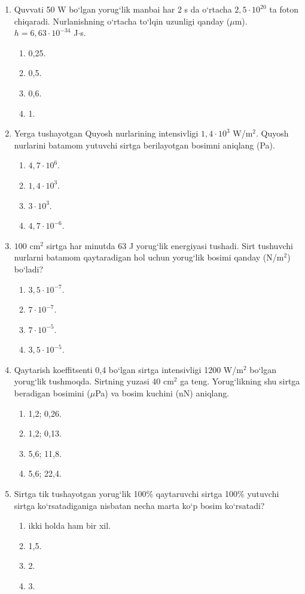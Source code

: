 \begin{enumerate}
\item Quvvati 50 W bo‘lgan yorug‘lik manbai har 2 s da o‘rtacha $2,5\cdot 10^{20}$ ta foton chiqaradi. Nurlanishning o‘rtacha to‘lqin uzunligi qanday ($\mu$m). $h = 6,63\cdot 10^{-34}$ J$\cdot$s.
\begin{enumerate}[label=\Alph*)]
\item 0,25.
\item 0,5.
\item 0,6.
\item 1.
\end{enumerate}

\item Yerga tushayotgan Quyosh nurlarining intensivligi $1,4\cdot 10^3$ W/m$^2$. Quyosh nurlarini batamom yutuvchi sirtga berilayotgan bosimni aniqlang (Pa).
\begin{enumerate}[label=\Alph*)]
\item $4,7\cdot 10^6$.
\item $1,4\cdot 10^3$.
\item $3\cdot 10^3$.
\item $4,7\cdot 10^{-6}$.
\end{enumerate}

\item $100\text{ cm}^2$ sirtga har minutda 63 J yorug‘lik energiyasi tushadi. Sirt tushuvchi nurlarni batamom qaytaradigan hol uchun yorug‘lik bosimi qanday (N/m$^2$) bo‘ladi?
\begin{enumerate}[label=\Alph*)]
\item $3,5\cdot 10^{-7}$.
\item $7\cdot 10^{-7}$.
\item $7\cdot 10^{-5}$.
\item $3,5\cdot 10^{-5}$.
\end{enumerate}

\item Qaytarish koeffitsenti 0,4 bo‘lgan sirtga intensivligi 1200 W/m$^2$ bo‘lgan yorug‘lik tushmoqda. Sirtning yuzasi $40\text{ cm}^2$ ga teng. Yorug‘likning shu sirtga beradigan bosimini ($\mu$Pa) va bosim kuchini (nN) aniqlang.
\begin{enumerate}[label=\Alph*)]
\item 1,2; 0,26.
\item 1,2; 0,13.
\item 5,6; 11,8.
\item 5,6; 22,4.
\end{enumerate}

\item Sirtga tik tushayotgan yorug‘lik 100\% qaytaruvchi sirtga 100\% yutuvchi sirtga ko‘rsatadiganiga nisbatan necha marta ko‘p bosim ko‘rsatadi?
\begin{enumerate}[label=\Alph*)]
\item ikki holda ham bir xil.
\item 1,5.
\item 2.
\item 3.
\end{enumerate}

\end{enumerate}



